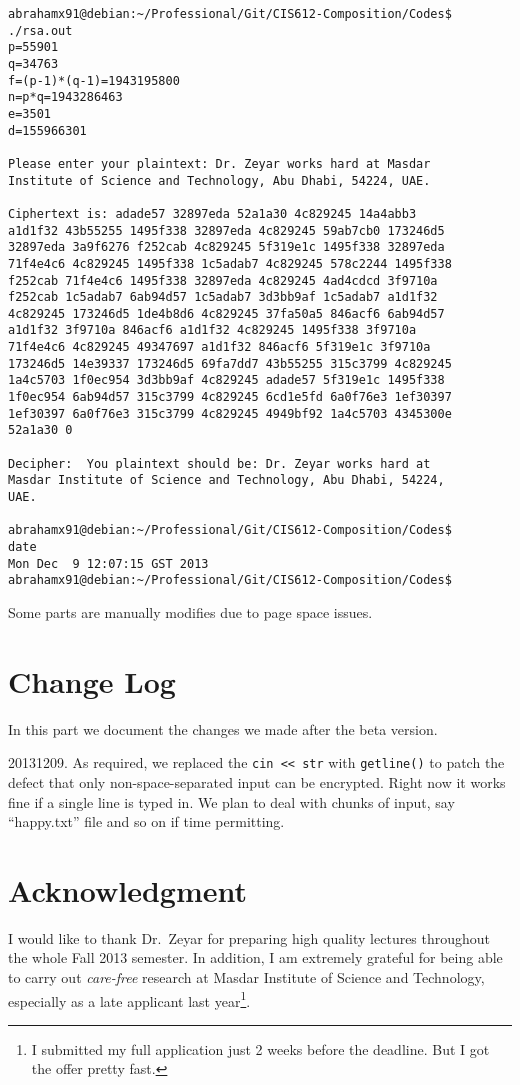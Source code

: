 \documentclass[12pt]{article}
\begin{document}
\begin{Verbatim}[showspaces=true]
abrahamx91@debian:~/Professional/Git/CIS612-Composition/Codes$
./rsa.out 
p=55901
q=34763
f=(p-1)*(q-1)=1943195800
n=p*q=1943286463
e=3501
d=155966301

Please enter your plaintext: Dr. Zeyar works hard at Masdar 
Institute of Science and Technology, Abu Dhabi, 54224, UAE.

Ciphertext is: adade57 32897eda 52a1a30 4c829245 14a4abb3 
a1d1f32 43b55255 1495f338 32897eda 4c829245 59ab7cb0 173246d5
32897eda 3a9f6276 f252cab 4c829245 5f319e1c 1495f338 32897eda
71f4e4c6 4c829245 1495f338 1c5adab7 4c829245 578c2244 1495f338
f252cab 71f4e4c6 1495f338 32897eda 4c829245 4ad4cdcd 3f9710a
f252cab 1c5adab7 6ab94d57 1c5adab7 3d3bb9af 1c5adab7 a1d1f32
4c829245 173246d5 1de4b8d6 4c829245 37fa50a5 846acf6 6ab94d57
a1d1f32 3f9710a 846acf6 a1d1f32 4c829245 1495f338 3f9710a
71f4e4c6 4c829245 49347697 a1d1f32 846acf6 5f319e1c 3f9710a
173246d5 14e39337 173246d5 69fa7dd7 43b55255 315c3799 4c829245
1a4c5703 1f0ec954 3d3bb9af 4c829245 adade57 5f319e1c 1495f338
1f0ec954 6ab94d57 315c3799 4c829245 6cd1e5fd 6a0f76e3 1ef30397
1ef30397 6a0f76e3 315c3799 4c829245 4949bf92 1a4c5703 4345300e
52a1a30 0 

Decipher:  You plaintext should be: Dr. Zeyar works hard at
Masdar Institute of Science and Technology, Abu Dhabi, 54224,
UAE.

abrahamx91@debian:~/Professional/Git/CIS612-Composition/Codes$
date
Mon Dec  9 12:07:15 GST 2013
abrahamx91@debian:~/Professional/Git/CIS612-Composition/Codes$ 

\end{Verbatim}
Some parts are manually modifies due to page space issues.

\section*{Change Log}
\label{sec:changelog}
In this part we document the changes we made after the beta version.
\par
20131209. As required, we replaced the \verb|cin << str| with
\verb|getline()| to patch the defect that only
non-space-separated input can be encrypted. Right now it works fine if
a single line is typed in. We plan to deal with chunks of input, say
``happy.txt'' file and so on if time permitting.



\section*{Acknowledgment}
\label{sec:acknowledgment}
I would like to thank Dr.\ Zeyar for preparing high quality lectures
throughout the whole Fall 2013 semester. In addition, I am extremely
grateful for being able to carry out \emph{care-free} research at
Masdar Institute of Science and Technology, especially as a late
applicant last year\footnote{I submitted my full application just 2 weeks
before the deadline. But I got the offer pretty fast.}.





\end{document}

